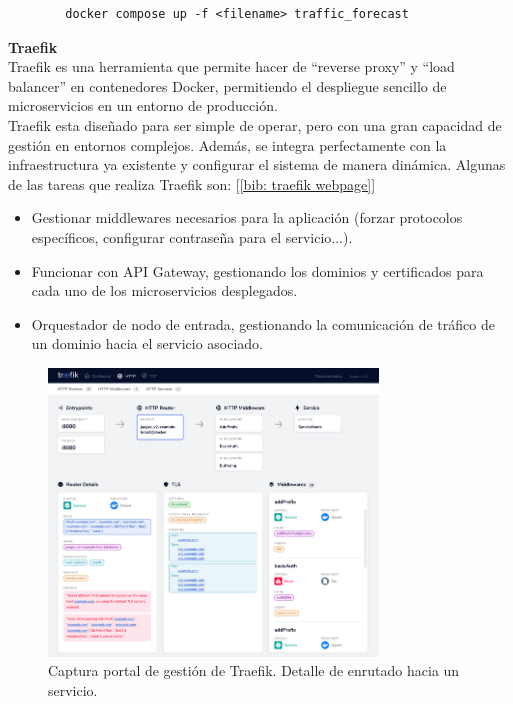 \documentclass[a4paper, oneside, 12pt]{book}
\begin{document}
	\begin{verbatim}
		docker compose up -f <filename> traffic_forecast
	\end{verbatim}
	
	\noindent \textbf{\large Traefik} \\
	
	\noindent Traefik es una herramienta que permite hacer de ``reverse proxy'' y ``load balancer'' en contenedores Docker, permitiendo el despliegue sencillo de microservicios en un entorno de producción. \\
	
	\noindent Traefik esta diseñado para ser simple de operar, pero con una gran capacidad de gestión en entornos complejos. Además, se integra perfectamente con la infraestructura ya existente y configurar el sistema de manera dinámica. Algunas de las tareas que realiza Traefik son: [\ref{bib: traefik webpage}] 
	
	\begin{itemize}
		\item Gestionar middlewares necesarios para la aplicación (forzar protocolos específicos, configurar contraseña para el servicio...).
		\item Funcionar con API Gateway, gestionando los dominios y certificados para cada uno de los microservicios desplegados.
		\item Orquestador de nodo de entrada, gestionando la comunicación de tráfico de un dominio hacia el servicio asociado.
	\end{itemize}

	\begin{figure}[h!]
		\begin{center}
			\includegraphics[width=0.78\textwidth]{img/traefik_example.png}
			\caption{Captura portal de gestión de Traefik. Detalle de enrutado hacia un servicio.}
		\end{center}
	\end{figure}
	
\end{document}
